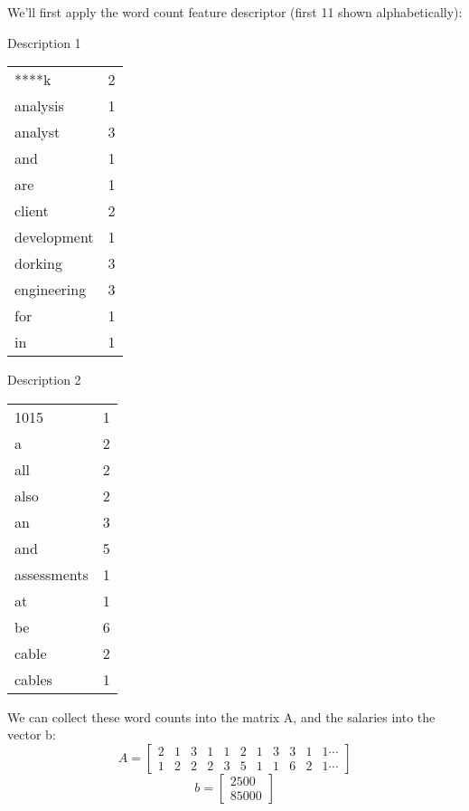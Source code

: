 \documentclass[12pt]{article}
\begin{document}
We'll first apply the word count feature descriptor (first 11 shown alphabetically):
\newline
\begin{centering}
\begin{minipage}[t]{.4\textwidth}
Description 1
\newline
\begin{tabular}{l|c}
****k & 2 \\
analysis & 1\\
analyst & 3\\
and & 1\\
are & 1\\
client & 2\\
development & 1\\
dorking & 3\\
engineering & 3\\
for & 1\\
in & 1 \\
\end{tabular}
\end{minipage}
\begin{minipage}[t]{.4\textwidth}
Description 2
\newline
\begin{tabular}{l|c}
1015 & 1 \\
a & 2 \\
all & 2 \\
also & 2\\
an & 3 \\
and & 5 \\
assessments & 1 \\
at & 1 \\
be & 6 \\
cable & 2 \\
cables & 1\\
\end{tabular}
\end{minipage}
\end{centering}
\newline

We can collect these word counts into the matrix A, and the salaries into the vector b:
\newline
\begin{equation*}
A = 
\begin{bmatrix}
2 & 1 & 3 & 1 & 1 & 2 & 1 & 3 & 3 & 1 & 1 \cdots\\
1 & 2 & 2 & 2 & 3 & 5 & 1 & 1 & 6 & 2 & 1 \cdots
\end{bmatrix}
\end{equation*}
\newline
\begin{equation*}
b = 
\begin{bmatrix}
2500\\
85000
\end{bmatrix}
\end{equation*}
\end{document}
